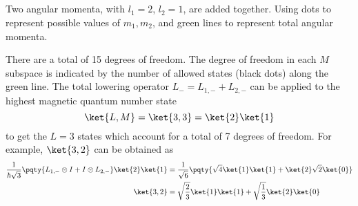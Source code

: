 \documentclass[12pt]{article}
\begin{document}
        \subsection{} Two angular momenta, with \(l_1 = 2\), \(l_2 = 1\), are added together. Using dots to represent possible values of \(m_1,m_2\), and green lines to represent total angular momenta. \begin{center}
        \end{center}
        There are a total of 15 degrees of freedom. The degree of freedom in each \(M\) subspace is indicated by the number of allowed states (black dots) along the green line. The total lowering operator \(L_ -= L_{1, -} + L_{2, -}\) can be applied to the highest magnetic quantum number state \[
            \ket{L,M} = \ket{3,3} = \ket{2} \ket{1} 
        \] to get the \(L = 3\) states which account for a total of 7 degrees of freedom. For example, \(\ket{3,2} \) can be obtained as \begin{align*}
            \frac{1}{\hbar\sqrt{3}}\pqty{L_{1, -} \otimes I + I \otimes L_{2, - }} \ket{2} \ket{1} &= \frac{1}{\sqrt{6}}\pqty{\sqrt{4} \ket{1} \ket{1}  + \ket{2} \sqrt{2} \ket{0}}\\ 
            \ket{3,2} &= \sqrt{\frac{2}{3}} \ket{1} \ket{1} + \sqrt{\frac{1}{3}} \ket{2} \ket{0}  
        \end{align*}
\end{document}
